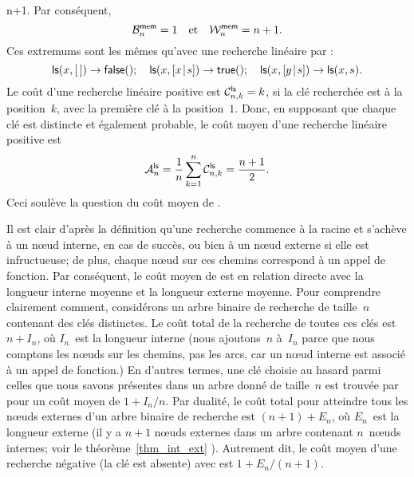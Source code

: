 n+1\).
Par conséquent,
\begin{equation*}
\B{\fun{mem}}{n} = 1\quad\text{et}\quad \W{\fun{mem}}{n} = n + 1.
\index{mem@$\B{\fun{mem}}{n}$}\index{mem@$\W{\fun{mem}}{n}$}
\end{equation*}
Ces extremums sont les mêmes qu'avec une recherche
linéaire par
:
\begin{equation*}
\fun{ls}(x,\el)          \rightarrow  \fun{false}();\quad
\fun{ls}(x,\cons{x}{s})  \rightarrow  \fun{true}();\quad
\fun{ls}(x,\cons{y}{s})  \rightarrow  \fun{ls}(x,s).
\end{equation*}
Le coût d'une recherche linéaire positive est \(\C{\fun{ls}}{n,k} =
k\), si la clé recherchée est à la position~\(k\), avec la première
clé à la position~\(1\). Donc, en supposant que chaque clé est
distincte et également probable, le coût moyen d'une recherche
linéaire positive est
\begin{equation*}
  \M{\fun{ls}}{n} = \frac{1}{n}\sum_{k=1}^{n}\C{\fun{ls}}{n,k} =
  \frac{n+1}{2}.
  \index{recherche linéaire}
  \index{ls@$\M{\fun{ls}}{n}$}
\end{equation*}
Ceci soulève la question du coût moyen de
. 


Il est clair d'après la définition qu'une recherche commence à la
racine et s'achève à un nœud interne, en cas de succès, ou bien à
un nœud externe si elle est infructueuse; de plus, chaque nœud
sur ces chemins correspond à un appel de fonction. Par conséquent, le
coût moyen de  est en relation
directe avec la longueur interne moyenne et la longueur externe moyenne. Pour comprendre clairement
comment, considérons un arbre binaire de recherche de taille~\(n\)
contenant des clés distinctes. Le coût total de la recherche de toutes
ces clés est \(n+I_n\), où \(I_n\)~est la longueur interne (nous
ajoutons~\(n\) à~\(I_n\) parce que nous comptons les nœuds sur les
chemins, pas les arcs, car un nœud interne est associé à un appel
de fonction.)  En d'autres termes, une clé choisie au hasard parmi
celles que nous savons présentes dans un arbre donné de taille~\(n\)
est trouvée par  pour un coût moyen de \(1+I_n/n\). Par
dualité, le coût total pour atteindre tous les nœuds externes d'un
arbre binaire de recherche est \((n+1)+E_n\), où \(E_n\)~est la
longueur externe (il y a \(n+1\) nœuds externes dans un arbre
contenant \(n\)~nœuds internes; voir le théorème~\ref{thm_int_ext}
). Autrement dit, le coût moyen d'une recherche
négative (la clé est absente) avec 
est \(1 + E_n/(n+1)\).

